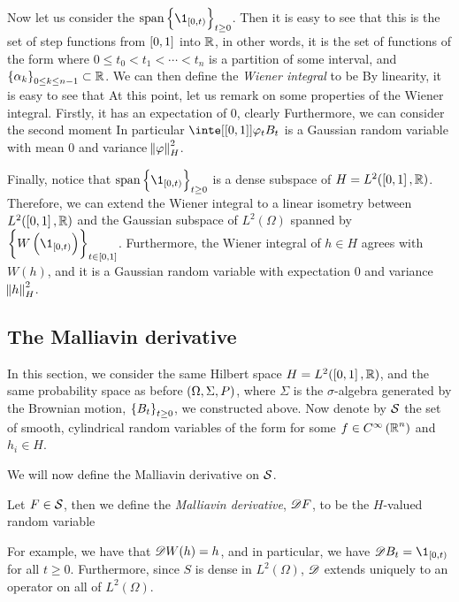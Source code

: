 \documentclass[../main.tex]{subfiles}
\begin{document}
Now let us consider the $\span\cbr{\1_{\intco{0,t}}}_{t\geq0}$. Then it is easy to see that this is the set of step functions from $\intcc{0,1}$ into $\R$, in other words, it is the set of functions of the form  where $0 \leq t_0 <t_1<\cdots <t_n$ is a partition of some interval, and $\cbr{\alpha_k}_{0\leq k\leq n-1}\subset\R$. We can then define the \emph{Wiener integral} to be  By linearity, it is easy to see that  At this point, let us remark on some properties of the Wiener integral. Firstly, it has an expectation of $0$, clearly  Furthermore, we can consider the second moment  In particular $\inte[\intcc{0,1}]{\varphi_t}{B_t}$ is a Gaussian random variable with mean $0$ and variance $\norm{\varphi}_H^2$.

Finally, notice that $\span\cbr{\1_{\intco{0,t}}}_{t\geq0}$ is a dense subspace of $H = L^2(\intcc{0,1},\R)$. Therefore, we can extend the Wiener integral to a linear isometry  between $L^2(\intcc{0,1},\R)$ and the Gaussian subspace of $L^2(\Omega)$ spanned by $\cbr{W\del{\1_{\intco{0,t}}}}_{t\in\intcc{0,1}}$. Furthermore, the Wiener integral of $h\in H$ agrees with $W(h)$, and it is a Gaussian random variable with expectation $0$ and variance $\norm{h}_H^2$.

\subsection{The Malliavin derivative}
In this section, we consider the same Hilbert space $H = L^2(\intcc{0,1},\R)$, and the same probability space as before $\del{\Omega,\Sigma,P}$, where $\Sigma$ is the $\sigma$-algebra generated by the Brownian motion, $\cbr{B_t}_{t\geq0}$, we constructed above. Now denote by $\S$ the set of smooth, cylindrical random variables of the form  for some $f\in C^\infty\del{\R^n}$ and $h_i\in H$.

We will now define the Malliavin derivative on $\S$.
\begin{definition}
\label{def:Mall_deriv}
Let $F\in\S$, then we define the \emph{Malliavin derivative}, $\Dif F$, to be the $H$-valued random variable 
\end{definition}
For example, we have that $\Dif W(h) = h$, and in particular, we have $\Dif B_t = \1_{\intco{0,t}}$ for all $t\geq0$. Furthermore, since $S$ is dense in $L^2(\Omega)$, $\Dif$ extends uniquely to an operator on all of $L^2(\Omega)$.
\end{document}
